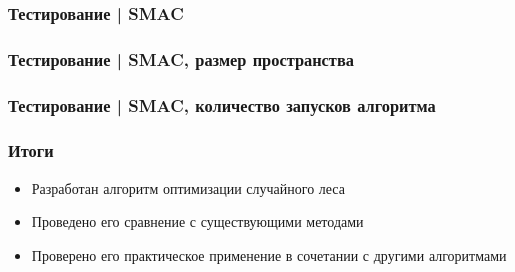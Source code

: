 \documentclass{beamer}
\begin{document}
\begin{frame} \frametitle{Тестирование | SMAC}
    \begin{center}
        \smacgeneral
    \end{center}
\end{frame}

\begin{frame} \frametitle{Тестирование | SMAC, размер пространства}
    \begin{center}
    \end{center}
\end{frame}

\begin{frame} \frametitle{Тестирование | SMAC, количество запусков алгоритма}
    \begin{center}
    \end{center}
\end{frame}

\begin{frame} \frametitle{Итоги}
    \begin{itemize}
        \item Разработан алгоритм оптимизации случайного леса
        \item Проведено его сравнение с существующими методами
        \item Проверено его практическое применение в сочетании с другими алгоритмами
    \end{itemize}
\end{frame}
\end{document}
